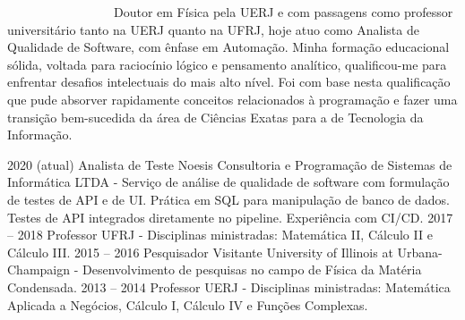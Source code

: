 \documentclass[9pt]{developercv} %
\begin{document}

\ \ \ \ \ \ \ \ \ \ \ \ \ \ \ \ \ Doutor em Física pela UERJ e com passagens como professor universitário tanto na UERJ quanto na UFRJ, hoje atuo como Analista de Qualidade de Software, com ênfase em Automação. Minha formação educacional sólida, voltada para raciocínio lógico e pensamento analítico, qualificou-me para enfrentar desafios intelectuais do mais alto nível. Foi com base nesta qualificação que pude absorver rapidamente conceitos relacionados à programação e fazer uma transição bem-sucedida da área de Ciências Exatas para a de Tecnologia da Informação.


\begin{entrylist}
	\entry
	{2020 (atual)}%
	{Analista de Teste}
	{Noesis Consultoria e Programação de Sistemas de Informática LTDA}
	{- Serviço de análise de qualidade de software com formulação de testes de API e de UI. Prática em SQL para manipulação de banco de dados. Testes de API integrados diretamente no pipeline. Experiência com CI/CD.}
		\entry
	{2017 -- 2018}
	{Professor}
	{UFRJ}
	{- Disciplinas ministradas: Matemática II, C\'alculo II e C\'alculo III.}
	\entry
	{2015 -- 2016}
	{Pesquisador Visitante}
	{University of Illinois at Urbana-Champaign}
	{- Desenvolvimento de pesquisas no campo de F\'isica da Mat\'eria Condensada.}
	\entry
	{2013 -- 2014}
	{Professor}
	{UERJ}
	{- Disciplinas ministradas: Matemática Aplicada a Negócios, C\'alculo I, C\'alculo IV e Funções Complexas.}
\end{entrylist}
\end{document}
